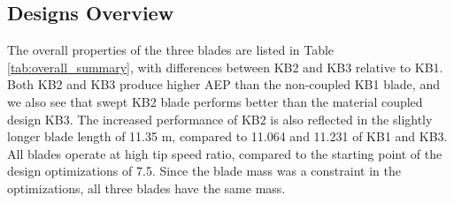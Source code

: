 \subsection{Designs Overview}

The overall properties of the three blades are listed in Table \ref{tab:overall_summary}, with differences between KB2 and KB3 relative to KB1.
Both KB2 and KB3 produce higher AEP than the non-coupled KB1 blade, and we also see that swept KB2 blade performs better than the material coupled design KB3.
The increased performance of KB2 is also reflected in the slightly longer blade length of 11.35 m, compared to 11.064 and 11.231 of KB1 and KB3.
All blades operate at high tip speed ratio, compared to the starting point of the design optimizations of 7.5.
Since the blade mass was a constraint in the optimizations, all three blades have the same mass.




